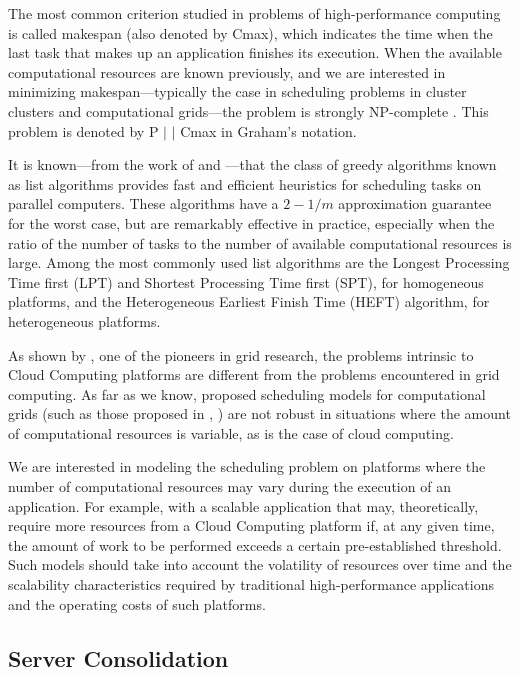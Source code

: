 \documentclass[12pt,a4paper]{article}
\begin{document}
The most common criterion studied in problems of high-performance computing is called makespan (also denoted by Cmax), which indicates the time when the last task that makes up an application finishes its execution. When the available computational resources are known previously, and we are interested in minimizing makespan---typically the case in scheduling problems in cluster clusters and computational grids---the problem is strongly NP-complete \citep{Garey}. This problem is denoted by P $\vert$ $\vert$ Cmax in Graham's notation.

It is known---from the work of \citet {graham} and \citet {Garey}---that the class of greedy algorithms known as list algorithms provides fast and efficient heuristics for scheduling tasks on parallel computers. These algorithms have a $2 -1 /m$ approximation guarantee for the worst case, but are remarkably effective in practice, especially when the ratio of the number of tasks to the number of available computational resources is large. Among the most commonly used list algorithms are the Longest Processing Time first (LPT) and Shortest Processing Time first (SPT),  for homogeneous platforms, and the Heterogeneous Earliest Finish Time (HEFT) algorithm, for heterogeneous platforms.


As shown by \citet {fos08}, one of the pioneers in grid research, the problems intrinsic to Cloud Computing platforms are different from the problems encountered in grid computing. As far as we know, proposed scheduling models for computational grids (such as those proposed in \citet{Buyya}, \citet{Ramirez}) are not robust in situations where the amount of computational resources is variable, as is the case of cloud computing.

We are interested in modeling the scheduling problem on platforms where the number of computational resources may vary during the execution of an application. For example, with a scalable application that may, theoretically, require more resources from a Cloud Computing platform if, at any given time, the amount of work to be performed exceeds a certain pre-established threshold. Such models should take into account the volatility of resources over time and the scalability characteristics required by traditional high-performance applications and the operating costs of such platforms.

\subsection{Server Consolidation}
\end{document}
